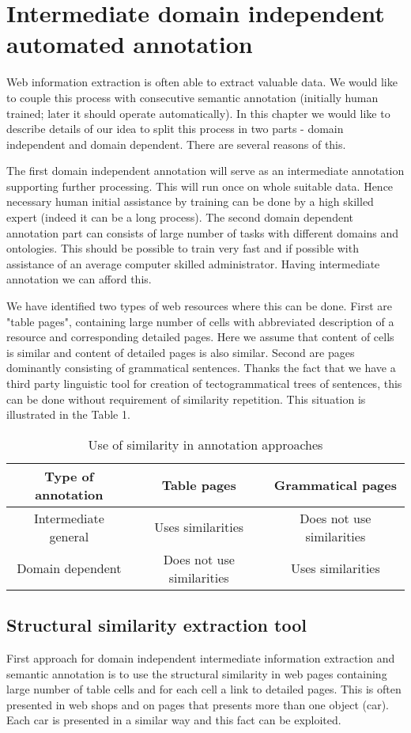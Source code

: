 \documentclass{sig-alternate}
\begin{document}
\section{Intermediate domain independent automated annotation}
Web information extraction is often able to extract valuable data. We would like to couple this process with consecutive semantic annotation (initially human trained; later it should operate automatically). In this chapter we would like to describe details of our idea to split this process in two parts - domain independent and domain dependent. There are several reasons of this. 

The first domain independent annotation will serve as an intermediate annotation supporting further processing. This will run once on whole suitable data. Hence necessary human initial assistance by training can be done by a high skilled expert (indeed it can be a long process).
The second domain dependent annotation part can consists of large number of tasks with different domains and ontologies. This should be possible to train very fast and if possible with assistance of an average computer skilled administrator. Having intermediate annotation we can afford this. 

We have identified two types of web resources where this can be done. First are "table pages", containing large number of cells with abbreviated description of a resource and corresponding detailed pages. Here we assume that content of cells is similar and content of detailed pages is also similar. Second are pages dominantly consisting of grammatical sentences. Thanks the fact that we have a third party linguistic tool for creation of tectogrammatical trees of sentences, this can be done without requirement of similarity repetition. This situation is illustrated in the Table 1.


\begin{table}
{\tiny\begin{tabular}{|c|c|c|} \hline
Type of annotation&Table pages&Grammatical pages\\ \hline
Intermediate general&Uses similarities&Does not use similarities\\ \hline
Domain dependent&Does not use similarities&Uses similarities\\ \hline
\end{tabular}}
\label{table1}
\caption{Use of similarity in annotation approaches}
\end{table} 

\subsection{Structural similarity extraction tool}
First approach for domain independent intermediate information extraction and semantic annotation is to use the structural similarity in web pages containing large number of table cells and for each cell a link to detailed pages. This is often presented in web shops and on pages that presents more than one object (car). Each car is presented in a similar way and this fact can be exploited.
\end{document}
